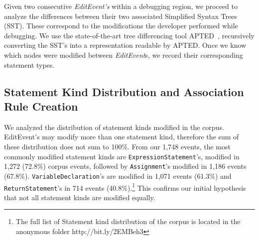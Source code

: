 \documentclass[sigconf]{acmart}
\begin{document}
Given two consecutive \textit{EditEvent's} within
a debugging region, we proceed to analyze the differences
between their two associated Simplified Syntax Trees (SST).
These correspond to the modifications the developer performed
while debugging.
We use the 
state-of-the-art tree differencing
tool APTED~\cite{Pawlik16Apted}, recursively converting the SST's into a
representation readable by APTED. 
Once we know which nodes were modified between \textit{EditEvent}s, we record
their corresponding statement types. 

\subsection{Statement Kind Distribution and Association Rule Creation}

We analyzed the distribution of statement kinds modified
in the corpus.  EditEvent's may modify more than one
statement kind, therefore the sum of these distribution
does not sum to 100\%.
From our 1,748 events, the most commonly modified statement
kinds are \texttt{ExpressionStatement}'s, modified in 1,272 (72.8\%) 
corpus events,
followed by \texttt{Assignment}'s modified in 1,186 
events (67.8\%). \texttt{VariableDeclaration}'s are modified in 1,071
events (61.3\%) and \texttt{ReturnStatement}'s in 714
events (40.8\%).\footnote{The full list of Statement kind
distribution of the corpus is located in the anonymous folder 
http://bit.ly/2EMBeh3} This confirms our initial hypothesis that
not all statement kinds are modified equally.


\end{document}
